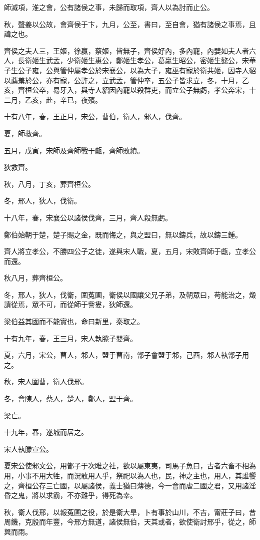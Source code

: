 \begin{pinyinscope}
師滅項，淮之會，公有諸侯之事，未歸而取項，齊人以為討而止公。

秋，聲姜以公故，會齊侯于卞，九月，公至，書曰，至自會，猶有諸侯之事焉，且諱之也。

齊侯之夫人三，王姬，徐嬴，蔡姬，皆無子，齊侯好內，多內寵，內嬖如夫人者六人，長衛姬生武孟，少衛姬生惠公，鄭姬生孝公，葛嬴生昭公，密姬生懿公，宋華子生公子雍，公與管仲屬孝公於宋襄公，以為大子，雍巫有寵於衛共姬，因寺人貂以薦羞於公，亦有寵，公許之，立武孟，管仲卒，五公子皆求立，冬，十月，乙亥，齊桓公卒，易牙入，與寺人貂因內寵以殺群吏，而立公子無虧，孝公奔宋，十二月，乙亥，赴，辛已，夜殯。

十有八年，春，王正月，宋公，曹伯，衛人，邾人，伐齊。

夏，師救齊。

五月，戊寅，宋師及齊師戰于甗，齊師敗績。

狄救齊。

秋，八月，丁亥，葬齊桓公。

冬，邢人，狄人，伐衛。

十八年，春，宋襄公以諸侯伐齊，三月，齊人殺無虧。

鄭伯始朝于楚，楚子賜之金，既而悔之，與之盟曰，無以鑄兵，故以鑄三鍾。

齊人將立孝公，不勝四公子之徒，遂與宋人戰，夏，五月，宋敗齊師于甗，立孝公而還。

秋八月，葬齊桓公。

冬，邢人，狄人，伐衛，圍菟圃，衛侯以國讓父兄子弟，及朝眾曰，苟能治之，燬請從焉，眾不可，而從師于訾婁，狄師還。

梁伯益其國而不能實也，命曰新里，秦取之。

十有九年，春，王三月，宋人執滕子嬰齊。

夏，六月，宋公，曹人，邾人，盟于曹南，鄫子會盟于邾，己酉，邾人執鄫子用之。

秋，宋人圍曹，衛人伐邢。

冬，會陳人，蔡人，楚人，鄭人，盟于齊。

梁亡。

十九年，春，遂城而居之。

宋人執滕宣公。

夏宋公使邾文公，用鄫子于次睢之社，欲以屬東夷，司馬子魚曰，古者六畜不相為用，小事不用大牲，而況敢用人乎，祭祀以為人也，民，神之主也，用人，其誰饗之，齊桓公存三亡國，以屬諸侯，義士猶曰薄德，今一會而虐二國之君，又用諸淫昏之鬼，將以求霸，不亦難乎，得死為幸。

秋，衛人伐邢，以報菟圃之役，於是衛大旱，卜有事於山川，不吉，甯莊子曰，昔周饑，克殷而年豐，今邢方無道，諸侯無伯，天其或者，欲使衛討邢乎，從之，師興而雨。


\end{pinyinscope}
